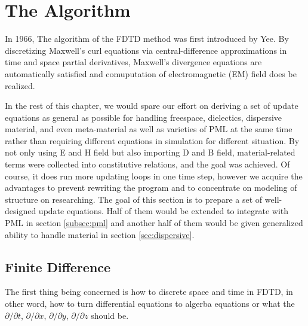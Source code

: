\section{The Algorithm}
In 1966, The algorithm of the FDTD method was first introduced by Yee. By discretizing Maxwell's curl equations via
central-difference approximations in time and space partial derivatives, Maxwell's divergence equations are
automatically satisfied and comuputation of electromagnetic (EM) field does be realized.

In the rest of this chapter, we would spare our effort on deriving a set of update equations as general as possible for
handling freespace, dielectics, dispersive material, and even meta-material as well as varieties of PML at the same time
rather than requiring different equations in simulation for different situation. By not only using E and H field but
also importing D and B field, material-related terms were collected into constitutive relations, and the goal was
achieved. Of course, it does run more updating loops in one time step, however we acquire the advantages to prevent
rewriting the program and to concentrate on modeling of structure on researching. The goal of this section is to prepare
a set of well-designed update equations. Half of them would be extended to integrate with PML in section
\ref{subsec:pml} and another half of them would be given generalized ability to handle material in section
\ref{sec:dispersive}.

\subsection{Finite Difference}
The first thing being concerned is how to discrete space and time in FDTD, in other word, how to turn differential
equations to algerba equations or what the $\partial/\partial t$, $\partial/\partial x$, $\partial/\partial y$,
$\partial/\partial z$ should be.
